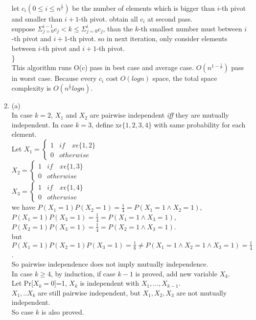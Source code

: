 \documentclass[11pt]{article}
\begin{document}
\begin{enumerate}
let $c_i(0\leq i \leq n^{\frac{1}{c}})$ be the number of elements which is bigger than $i$-th pivot and smaller than $i+1$-th pivot. obtain all $c_i$ at second pass. \\

suppose $\Sigma_{j=0}^{i-1} c_j < k \leq \Sigma_{j=0}^{i} c_j$, than the $k$-th smallest number must between $i$-th pivot and ${i+1}$-th pivot. so in next iteration, only consider elements between $i$-th pivot and $i+1$-th pivot. \\
\} \\

This algorithm runs O(c) pass in best case and average case. $O(n^{1-\frac{1}{c}})$ pass in worst case. 
Because every $c_i$ cost $O(log n)$ space, the total space complexity is $O(n^{\frac{1}{c}}log n)$.



\item 
(a) \\
In case $k=2$, $X_1$ and $X_2$ are pairwise independent \textit{iff} they are mutually independent.
In case $k=3$, define x$\epsilon\{1,2,3,4\}$ with same probability for each element. \\
Let $X_1=\left\{\begin{matrix}
1 & if \quad x\epsilon\{1,2\}&\\ 
0 & otherwise &
\end{matrix}\right.$ \\
$X_2=\left\{\begin{matrix}
1 & if \quad x\epsilon\{1,3\}&\\ 
0 & otherwise &
\end{matrix}\right.$ \\
$X_3=\left\{\begin{matrix}
1 & if \quad x\epsilon\{1,4\}&\\ 
0 & otherwise &
\end{matrix}\right.$ \\
we have $P(X_1=1)P(X_2=1)=\frac{1}{4}=P(X_1=1 \wedge X_2=1)$, \\
 $P(X_1=1)P(X_3=1)=\frac{1}{4}=P(X_1=1 \wedge X_3=1)$, \\
 $P(X_2=1)P(X_3=1)=\frac{1}{4}=P(X_2=1 \wedge X_3=1)$. \\
but  $P(X_1=1)P(X_2=1)P(X_3=1)=\frac{1}{8} \neq P(X_1=1 \wedge X_2=1 \wedge X_3=1)=\frac{1}{4}$. \\
So pairwise independence does not imply mutually independence. \\
In case $k \geq 4$, by induction, if case $k-1$ is proved, add new variable $X_k$. \\
Let Pr[$X_k=0$]=1, $X_k$ is independent with $X_1,...,X_{k-1}$. \\
$X_1,..X_k$ are still pairwise independent, but $X_1,X_2,X_3$ are not mutually independent. \\
So case $k$ is also proved. \\



\end{enumerate}
\end{document}
